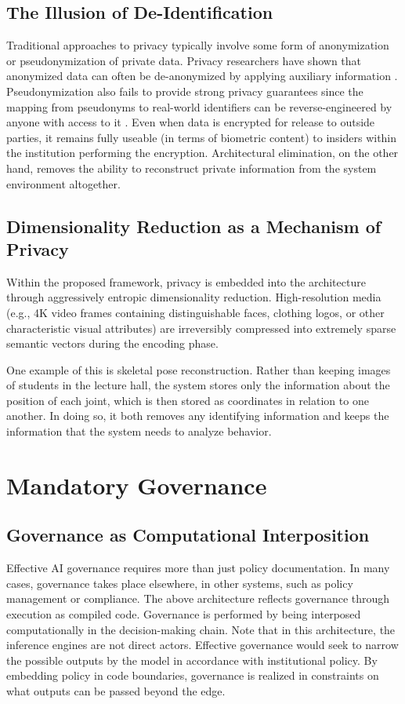 \documentclass[conference]{IEEEtran}
\begin{document}
\subsection{The Illusion of De-Identification}
Traditional approaches to privacy typically involve some form of anonymization or pseudonymization of private data. Privacy researchers have shown that anonymized data can often be de-anonymized by applying auxiliary information \cite{b20}. Pseudonymization also fails to provide strong privacy guarantees since the mapping from pseudonyms to real-world identifiers can be reverse-engineered by anyone with access to it \cite{b2}. Even when data is encrypted for release to outside parties, it remains fully useable (in terms of biometric content) to insiders within the institution performing the encryption. Architectural elimination, on the other hand, removes the ability to reconstruct private information from the system environment altogether.

\subsection{Dimensionality Reduction as a Mechanism of Privacy}

Within the proposed framework, privacy is embedded into the architecture through aggressively entropic dimensionality reduction. High-resolution media (e.g., 4K video frames containing distinguishable faces, clothing logos, or other characteristic visual attributes) are irreversibly compressed into extremely sparse semantic vectors during the encoding phase.

One example of this is skeletal pose reconstruction. Rather than keeping images of students in the lecture hall, the system stores only the information about the position of each joint, which is then stored as coordinates in relation to one another. In doing so, it both removes any identifying information and keeps the information that the system needs to analyze behavior.

\section{Mandatory Governance}

\subsection{Governance as Computational Interposition}
Effective AI governance requires more than just policy documentation. In many cases, governance takes place elsewhere, in other systems, such as policy management or compliance. The above architecture reflects governance through execution as compiled code. Governance is performed by being interposed computationally in the decision-making chain. Note that in this architecture, the inference engines are not direct actors. Effective governance would seek to narrow the possible outputs by the model in accordance with institutional policy. By embedding policy in code boundaries, governance is realized in constraints on what outputs can be passed beyond the edge.
\end{document}
